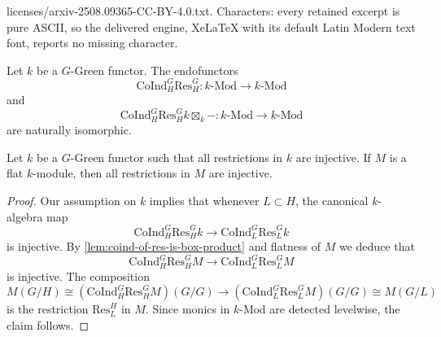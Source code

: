 \documentclass[10pt,a4paper]{amsart}
\newcommand{\Coind}{\mathrm{CoInd}}
\newcommand{\Mod}{\mathrm{Mod}}
\newcommand{\Res}{\mathrm{Res}}
\begin{document}
licenses/arxiv-2508.09365-CC-BY-4.0.txt. Characters: every retained excerpt is pure ASCII, so the delivered engine, XeLaTeX with its default Latin Modern text font, reports no missing character.
\begin{lemma}\label{lem:coind-of-res-is-box-product}
    Let $k$ be a $G$-Green functor. The endofunctors 
    \[ 
        \Coind_H^G \Res_H^G : k \text{-} \Mod \rightarrow k \text{-} \Mod 
    \] 
    and 
    \[ 
        \Coind_H^G \Res_H^G k \boxtimes_k - : k \text{-} \Mod \rightarrow k \text{-} \Mod 
    \] 
    are naturally isomorphic.
\end{lemma}

\begin{lemma}\label{lem:flat-over-MRC-implies-MRC}
    Let $k$ be a $G$-Green functor such that all restrictions in $k$ are injective. If $M$ is a flat $k$-module, then all restrictions in $M$ are injective.
\end{lemma}

\begin{proof}
    Our assumption on $k$ implies that whenever $L \subset H$, the canonical $k$-algebra map 
    \[ 
        \Coind_H^G \Res_H^G k \rightarrow \Coind_L^G \Res_L^G k 
    \] 
    is injective. By \cref{lem:coind-of-res-is-box-product} and flatness of $M$ we deduce that 
    \[ 
        \Coind_H^G \Res_H^G M \rightarrow \Coind_L^G \Res_L^G M 
    \] 
    is injective. The composition 
    \[ 
        M(G/H) \cong (\Coind_H^G \Res_H^G M)(G/G) \rightarrow (\Coind_L^G \Res_L^G M)(G/G) \cong M(G/L) 
    \] 
    is the restriction $\Res_L^H$ in $M$. Since monics in $k \text{-} \Mod$ are detected levelwise, the claim follows.
\end{proof}
\end{document}
